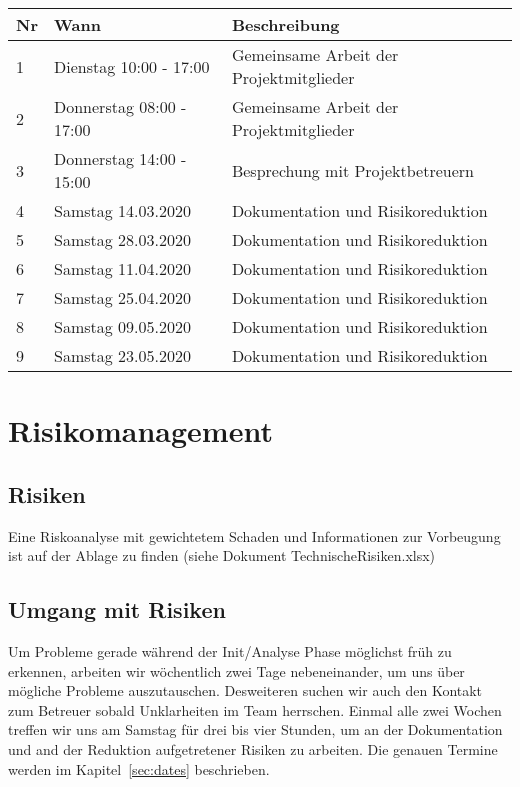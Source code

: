 \documentclass[
	ngerman,
	toc=listof, %
	toc=bibliography, %
	footnotes=multiple, %
	parskip=half, %
	numbers=noendperiod %
]{scrartcl}
\begin{document}
		\begin{tabularx}{0.9 \linewidth}{llX}
			\toprule
			Nr & Wann & Beschreibung \\
			\midrule
			1 & Dienstag 10:00 - 17:00 & Gemeinsame Arbeit der Projektmitglieder \\
			2 & Donnerstag 08:00 - 17:00 & Gemeinsame Arbeit der Projektmitglieder \\
			3 & Donnerstag 14:00 - 15:00 & Besprechung mit Projektbetreuern \\
			4 & Samstag 14.03.2020 & Dokumentation und Risikoreduktion\\
			5 & Samstag 28.03.2020 & Dokumentation und Risikoreduktion\\
			6 & Samstag 11.04.2020 & Dokumentation und Risikoreduktion\\
			7 & Samstag 25.04.2020 & Dokumentation und Risikoreduktion\\
			8 & Samstag 09.05.2020 & Dokumentation und Risikoreduktion\\
			9 & Samstag 23.05.2020 & Dokumentation und Risikoreduktion\\

			\bottomrule
		\end{tabularx}

\section{Risikomanagement}
\label{sec:risikomanagement}

	\subsection{Risiken}
		Eine Riskoanalyse mit gewichtetem Schaden und Informationen zur Vorbeugung ist auf der Ablage zu
		finden (siehe Dokument TechnischeRisiken.xlsx)

	\subsection{Umgang mit Risiken}
		Um Probleme gerade während der Init/Analyse Phase möglichst früh zu erkennen, 
		arbeiten wir wöchentlich zwei Tage nebeneinander, um uns über mögliche Probleme auszutauschen. 
		Desweiteren suchen wir auch den Kontakt zum Betreuer sobald Unklarheiten im Team herrschen.
		Einmal alle zwei Wochen treffen wir uns am Samstag für drei bis vier Stunden, um an der Dokumentation und and der Reduktion aufgetretener Risiken zu arbeiten. Die genauen Termine werden im Kapitel~\ref{sec:dates} beschrieben.
\end{document}
